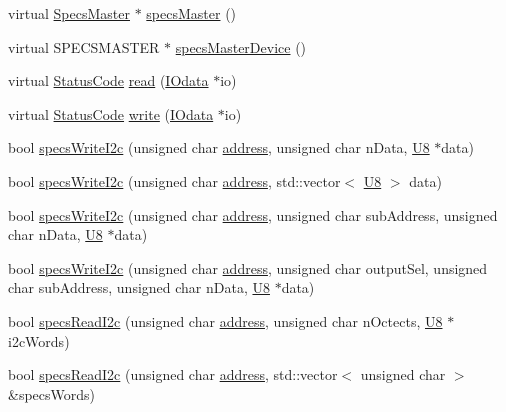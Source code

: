 \begin{DoxyCompactItemize}
\item 
virtual \hyperlink{classSpecsMaster}{Specs\+Master} $\ast$ \hyperlink{classSpecsInterface_a3d497c965fb6ec06b49a54b7901a22b2}{specs\+Master} ()
\item 
virtual S\+P\+E\+C\+S\+M\+A\+S\+T\+ER $\ast$ \hyperlink{classSpecsInterface_aa8aeaa74acf2c913905ea996d153a6ef}{specs\+Master\+Device} ()
\item 
virtual \hyperlink{classStatusCode}{Status\+Code} \hyperlink{classSpecsInterface_a6f1c8ca420f08c8fca9347ca743087c5}{read} (\hyperlink{classIOdata}{I\+Odata} $\ast$io)
\item 
virtual \hyperlink{classStatusCode}{Status\+Code} \hyperlink{classSpecsInterface_a33c7224b61bbb8d1ef20680f570ba4bd}{write} (\hyperlink{classIOdata}{I\+Odata} $\ast$io)
\item 
bool \hyperlink{classSpecsInterface_a20dacf68396a40eadbb740db73ff9624}{specs\+Write\+I2c} (unsigned char \hyperlink{classSpecsInterface_a0fa039a15b842a5ba783ce825b9915d8}{address}, unsigned char n\+Data, \hyperlink{ICECALv3_8h_a3cb25ca6f51f003950f9625ff05536fc}{U8} $\ast$data)
\item 
bool \hyperlink{classSpecsInterface_a00c49357f1f60e3e50de9a51fa127b79}{specs\+Write\+I2c} (unsigned char \hyperlink{classSpecsInterface_a0fa039a15b842a5ba783ce825b9915d8}{address}, std\+::vector$<$ \hyperlink{ICECALv3_8h_a3cb25ca6f51f003950f9625ff05536fc}{U8} $>$ data)
\item 
bool \hyperlink{classSpecsInterface_a08dff9a17cd6073cd94fbd2cf7340dbd}{specs\+Write\+I2c} (unsigned char \hyperlink{classSpecsInterface_a0fa039a15b842a5ba783ce825b9915d8}{address}, unsigned char sub\+Address, unsigned char n\+Data, \hyperlink{ICECALv3_8h_a3cb25ca6f51f003950f9625ff05536fc}{U8} $\ast$data)
\item 
bool \hyperlink{classSpecsInterface_ae208595624e222a9ff81d112dfbf5a97}{specs\+Write\+I2c} (unsigned char \hyperlink{classSpecsInterface_a0fa039a15b842a5ba783ce825b9915d8}{address}, unsigned char output\+Sel, unsigned char sub\+Address, unsigned char n\+Data, \hyperlink{ICECALv3_8h_a3cb25ca6f51f003950f9625ff05536fc}{U8} $\ast$data)
\item 
bool \hyperlink{classSpecsInterface_a7e9a0fe69a998e624ca2d7339b61bcb5}{specs\+Read\+I2c} (unsigned char \hyperlink{classSpecsInterface_a0fa039a15b842a5ba783ce825b9915d8}{address}, unsigned char n\+Octects, \hyperlink{ICECALv3_8h_a3cb25ca6f51f003950f9625ff05536fc}{U8} $\ast$i2c\+Words)
\item 
bool \hyperlink{classSpecsInterface_ab61d866ec9b8a48e84a867004c1ed662}{specs\+Read\+I2c} (unsigned char \hyperlink{classSpecsInterface_a0fa039a15b842a5ba783ce825b9915d8}{address}, std\+::vector$<$ unsigned char $>$ \&specs\+Words)

\end{DoxyCompactItemize}
